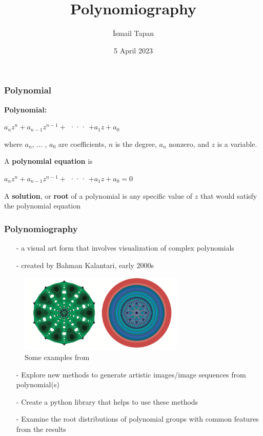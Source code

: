 \documentclass{beamer}
\begin{document}
 
\begin{frontpage}
	\title{Polynomiography}
	\author{İsmail Tapan}
	\date{5 April 2023}
\end{frontpage}

\begin{projectdefinition}
    \frametitle{{\color{white} Polynomial}}
    \textbf{Polynomial:}
    \begin{center}
    $a_nz^n +a_{n-1}z^{n-1} +$ ··· $+ a_1z+a_0$
    \end{center}

    where $a_n$, ... , $a_0$ are coefficients, $n$ is the degree, $a_n$ nonzero, and $z$ is a variable.

    A \textbf{polynomial equation} is
    \begin{center}        
    $a_nz^n +a_{n-1}z^{n-1} +$ ··· $+ a_1z+a_0 = 0$
    \end{center}

    A \textbf{solution}, or \textbf{root} of a polynomial is any specific value of $z$ that would satisfy the polynomial equation
    
\end{projectdefinition}

\begin{projectdefinition}
    \frametitle{{\color{white} Polynomiography}}
    \begin{itemize}
        \item[-] a visual art form that involves visualization of complex polynomials
        \item[-] created by Bahman Kalantari, early 2000s
    \end{itemize}
    \begin{figure}[h]
        \centering
        \includegraphics[width=0.7\textwidth]{fig1}
        \caption{Some examples from \citet{Kalantari_2008}}
    \end{figure}
    
\end{projectdefinition}


\begin{projectdefinition}
    \begin{itemize}
        \item[-] Explore new methods to generate  artistic images/image sequences from polynomial(s)
        \item[-] Create a python library that helps to use these methods
        \item[-] Examine the root distributions of polynomial groups with common features from the results
    \end{itemize}
\end{projectdefinition}
\end{document}
